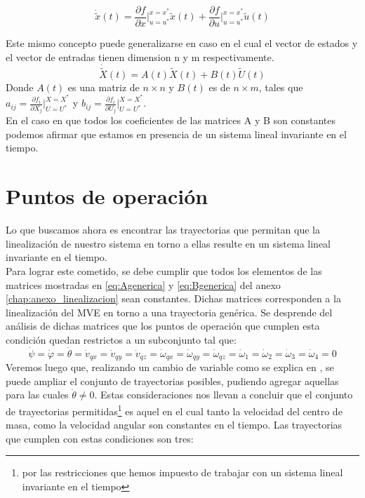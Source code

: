 \documentclass[main]{subfiles}
\begin{document}
\begin{equation}
\dot{\tilde{x}}(t)=\frac{\partial f}{\partial x}\vert_{u=u^*}^{x=x^*}\tilde{x}(t)+\frac{\partial f}{\partial u}\vert_{u=u^*}^{x=x^*}\tilde{u}(t)
\end{equation}

Este mismo concepto puede generalizarse en caso en el cual el vector de estados y el vector de entradas tienen dimension n y m respectivamente.
\begin{equation}
\dot{\tilde{X}}(t)=A(t)\tilde{X}(t)+B(t)\tilde{U}(t)
\end{equation}
Donde $A(t)$ es una matriz de $n \times n$ y $B(t)$ es de $n \times m$, tales que $a_{ij}= \frac{\partial f_i}{\partial X_j}\vert_{U=U^*}^{X=X^*}$ y  $b_{ij}= \frac{\partial f_i}{\partial U_j}\vert_{U=U^*}^{X=X^*}$.\\

En el caso en que todos los coeficientes de las matrices A y B son constantes podemos afirmar que estamos en presencia de un sistema lineal invariante en el tiempo. 

\section{Puntos de operaci\'on}
Lo que buscamos ahora es encontrar las trayectorias que permitan que la linealizaci\'on de nuestro sistema en torno a ellas resulte en un sistema lineal invariante en el tiempo.\\

Para lograr este cometido, se debe cumplir que todos los elementos de las matrices mostradas en \ref{eq:Agenerica} y \ref{eq:Bgenerica} del anexo \ref{chap:anexo_linealizacion} sean constantes. Dichas matrices corresponden a la linealizaci\'on del MVE en torno a una trayectoria gen\'erica. Se desprende del an\'alisis de dichas matrices que los puntos de operaci\'on que cumplen esta condici\'on quedan restrictos a un subconjunto tal que:
\begin{equation}
\dot{\psi}=\dot{\varphi}=\dot{\theta}=\dot{v}_{qx}=\dot{v}_{qy}=\dot{v}_{qz}=\dot{\omega}_{qx}=\dot{\omega}_{qy}=\dot{\omega}_{qz}=\dot{\omega}_1=\dot{\omega}_2=\dot{\omega}_3=\dot{\omega}_4=0
\end{equation}
Veremos luego que, realizando un cambio de variable como se explica en \cite{bib:auion}, se puede ampliar el conjunto de trayectorias posibles, pudiendo agregar aquellas para las cuales $\dot{\theta} \neq 0$. Estas consideraciones nos llevan a concluir que el conjunto de trayectorias permitidas\footnote{por las restricciones que hemos impuesto de trabajar con un sistema lineal invariante en el tiempo} es aquel en el cual tanto la velocidad del centro de masa, como la velocidad angular son constantes en el tiempo. Las trayectorias que cumplen con estas condiciones son tres:
\end{document}
